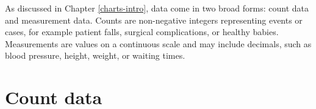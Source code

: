 \documentclass[
]{book}
\begin{document}
\begin{table}[!h]
\centering
\caption{\label{tab:limits-tab1}Formulas for calculating control limits}
\centering
{}
\end{table}

As discussed in Chapter \ref{charts-intro}, data come in two broad forms: count data and measurement data. Counts are non-negative integers representing events or cases, for example patient falls, surgical complications, or healthy babies. Measurements are values on a continuous scale and may include decimals, such as blood pressure, height, weight, or waiting times.

\section{Count data}\label{count-data-1}
\end{document}
